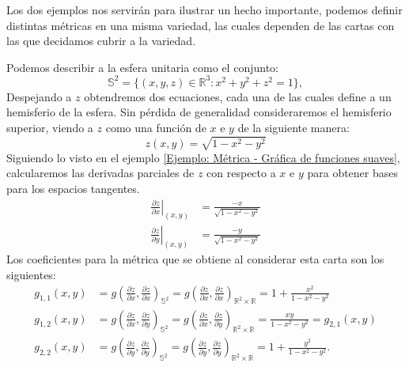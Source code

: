 Los dos ejemplos nos servirán para ilustrar un hecho importante, podemos definir distintas métricas en una misma variedad, las cuales dependen de las cartas con las que decidamos cubrir a la variedad.

\begin{example}[$2-$Esfera]\label{Ejemplo: Métrica en la Esfera}
	Podemos describir a la esfera unitaria como el conjunto:
	\[
		\mathbb{S}^{2} = \{(x,y,z) \in \mathbb{R}^{3}: x^{2} + y^{2} + z^{2} = 1\},
	\]
	Despejando a $z$ obtendremos dos ecuaciones, cada una de las cuales define a un hemisferio de la esfera. Sin pérdida de generalidad consideraremos el hemisferio superior, viendo a $z$ como una función de $x$ e $y$ de la siguiente manera:
	\[
		z(x,y) = \sqrt{1 - x^{2} - y^{2}}
	\]
	Siguiendo lo visto en el ejemplo \ref{Ejemplo: Métrica - Gráfica de funciones suaves}, calcularemos las derivadas parciales de $z$ con respecto a $x$ e $y$ para obtener bases para los espacios tangentes.
	\begin{align*}
		\left. \frac{\partial z}{\partial x} \right|_{(x,y)} & =
		\frac{-x}{\sqrt{1 - x^{2} - y^{2}}}                      \\
		\left. \frac{\partial z}{\partial y} \right|_{(x,y)} & =
		\frac{-y}{\sqrt{1 - x^{2} - y^{2}}}
	\end{align*}
	Los coeficientes para la métrica que se obtiene al considerar esta carta son los siguientes:
	\begin{align*}
		g_{1,1}(x,y) & = g\left(
		\frac{\partial z}{\partial x},\frac{\partial z}{\partial x}
		\right)_{\mathbb{S}^{2}} =
		g\left(
		\frac{\partial z}{\partial x},\frac{\partial z}{\partial x}
		\right)_{\mathbb{R}^{2} \times \mathbb{R}}
		= 1 + \frac{x^{2}}{1 - x^{2} - y^{2}}         \\[12pt]
		g_{1,2}(x,y) & = g\left(
		\frac{\partial z}{\partial x},\frac{\partial z}{\partial y}
		\right)_{\mathbb{S}^{2}} =
		g\left(
		\frac{\partial z}{\partial x},\frac{\partial z}{\partial y}
		\right)_{\mathbb{R}^{2} \times \mathbb{R}}
		= \frac{xy}{1 - x^{2} - y^{2}} = g_{2,1}(x,y) \\[12pt]
		g_{2,2}(x,y) & = g\left(
		\frac{\partial z}{\partial y},\frac{\partial z}{\partial y}
		\right)_{\mathbb{S}^{2}} =
		g\left(
		\frac{\partial z}{\partial y},\frac{\partial z}{\partial y}
		\right)_{\mathbb{R}^{2} \times \mathbb{R}}
		= 1 + \frac{y^{2}}{1 - x^{2} - y^{2}}.
	\end{align*}



\end{example}
